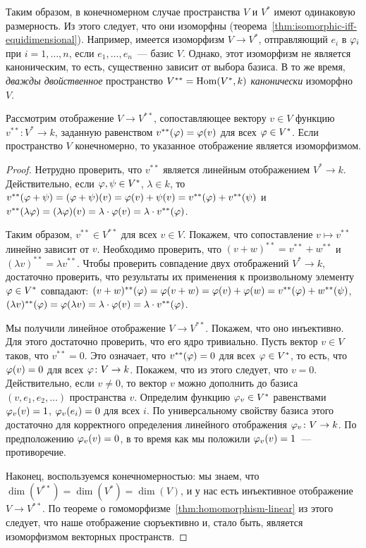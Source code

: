 Таким образом, в конечномерном случае пространства $V$ и $V^*$ имеют
одинаковую размерность. Из этого следует, что они изоморфны
(теорема~\ref{thm:isomorphic-iff-equidimensional}). Например, имеется
изоморфизм $V\to V^*$, отправляющий $e_i$ в $\varphi_i$ при $i=1,\dots,n$,
если $e_1,\dots,e_n$~--- базис $V$. Однако, этот изоморфизм не
является каноническим, то есть, существенно зависит от выбора базиса.
В то же время, {\it дважды двойственное} пространство
$V^{**} = \operatorname{Hom}(V^*,k)$ {\it канонически} изоморфно $V$.

\begin{proposition}
Рассмотрим отображение $V\to V^{**}$, сопоставляющее вектору $v\in V$
функцию $v^{**}\colon V^*\to k$, заданную равенством $v^{**}(\varphi) =
\varphi(v)$ для всех $\varphi\in V^*$. Если пространство $V$ конечномерно, то
указанное отображение является изоморфизмом.
\end{proposition}
\begin{proof}
Нетрудно проверить, что $v^{**}$ является линейным
отображением $V^*\to k$. Действительно, если $\varphi,\psi\in V^*$,
$\lambda\in k$, то
$v^{**}(\varphi+\psi) = (\varphi+\psi)(v) = \varphi(v) + \psi(v) = v^{**}(\varphi) +
v^{**}(\psi)$ и $v^{**}(\lambda\varphi) = (\lambda\varphi)(v) = \lambda\cdot\varphi(v)
= \lambda\cdot v^{**}(\varphi)$.

Таким образом, $v^{**}\in V^{**}$ для всех $v\in V$. Покажем, что
сопоставление $v\mapsto v^{**}$ линейно зависит от $v$. Необходимо
проверить, что $(v+w)^{**} = v^{**} + w^{**}$ и $(\lambda v)^{**} =
\lambda v^{**}$. Чтобы проверить совпадение двух отображений $V^*\to
k$, достаточно проверить, что результаты их применения к произвольному
элементу $\varphi\in V^*$ совпадают:
$(v+w)^{**}(\varphi) = \varphi(v+w) = \varphi(v)+\varphi(w) = v^{**}(\varphi) +
w^{**}(\psi)$, $(\lambda v)^{**}(\varphi) = \varphi(\lambda v) =
\lambda\cdot\varphi(v) = \lambda\cdot v^{**}(\varphi)$.

Мы получили линейное отображение $V\to V^{**}$. Покажем, что оно
инъективно. Для этого достаточно проверить, что его ядро
тривиально. Пусть вектор $v\in V$ таков, что $v^{**}=0$. Это означает,
что $v^{**}(\varphi) = 0$ для всех $\varphi\in V^*$, то есть, что $\varphi(v)=0$
для всех $\varphi\colon V\to k$. Покажем, что из этого следует, что
$v=0$. Действительно, если $v\neq 0$, то вектор $v$ можно дополнить до
базиса $(v,e_1,e_2,\dots)$ пространства $v$. Определим функцию
$\varphi_v\in V^*$ равенствами $\varphi_v(v)=1$, $\varphi_v(e_i)=0$ для всех
$i$. По универсальному свойству базиса этого достаточно для
корректного определения линейного отображения $\varphi_v\colon V\to k$. По
предположению $\varphi_v(v) = 0$, в то время как мы положили
$\varphi_v(v) = 1$~--- противоречие.

Наконец, воспользуемся конечномерностью: мы знаем, что $\dim(V^{**}) =
\dim(V^*) = \dim(V)$, и у нас есть инъективное отображение $V\to
V^{**}$. По теореме о гомоморфизме~\ref{thm:homomorphism-linear}
из этого следует, что наше отображение сюръективно
и, стало быть, является изоморфизмом векторных пространств.
\end{proof}

